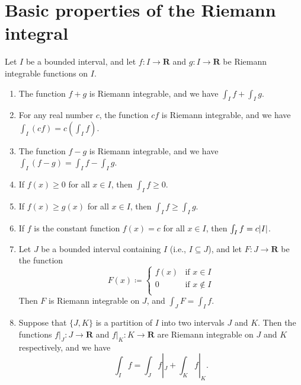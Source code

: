 \section{Basic properties of the Riemann integral}\label{sec 11.4}

\begin{theorem}\label{11.4.1}
    Let \(I\) be a bounded interval, and let \(f : I \to \mathbf{R}\) and \(g : I \to \mathbf{R}\) be Riemann integrable functions on \(I\).
    \begin{enumerate}
        \item The function \(f + g\) is Riemann integrable, and we have \(\int_I f + \int_I g\).
        \item For any real number \(c\), the function \(cf\) is Riemann integrable, and we have \(\int_I (cf) = c(\int_I f)\).
        \item The function \(f - g\) is Riemann integrable, and we have \(\int_I (f - g) = \int_I f - \int_I g\).
        \item If \(f(x) \geq 0\) for all \(x \in I\), then \(\int_I f \geq 0\).
        \item If \(f(x) \geq g(x)\) for all \(x \in I\), then \(\int_I f \geq \int_I g\).
        \item If \(f\) is the constant function \(f(x) = c\) for all \(x \in I\), then \(\int_I f = c \abs*{I}\).
        \item Let \(J\) be a bounded interval containing \(I\) (i.e., \(I \subseteq J\)), and let \(F : J \to \mathbf{R}\) be the function
              \[
                  F(x) \coloneqq \begin{cases}
                      f(x) & \text{if } x \in I    \\
                      0    & \text{if } x \notin I \\
                  \end{cases}
              \]
              Then \(F\) is Riemann integrable on \(J\), and \(\int_J F = \int_I f\).
        \item Suppose that \(\{J, K\}\) is a partition of \(I\) into two intervals \(J\) and \(K\).
              Then the functions \(f|_J : J \to \mathbf{R}\) and \(f|_K : K \to \mathbf{R}\) are Riemann integrable on \(J\) and \(K\) respectively, and we have
              \[
                  \int_I f = \int_J f|_J + \int_K f|_K.
              \]
    \end{enumerate}
\end{theorem}